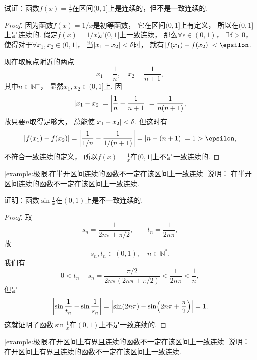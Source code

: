 \begin{example}\label{example:极限.在半开区间连续的函数不一定在该区间上一致连续}
试证：函数\(f(x) = \frac{1}{x}\)在区间\((0,1]\)上是连续的，但不是一致连续的.
\begin{proof}
因为函数\(f(x) = 1/x\)是初等函数，
它在区间\((0,1]\)上有定义，
所以在\((0,1]\)上是连续的.
假定\(f(x) = 1/x\)是\((0,1]\)上一致连续，
那么\(\forall \epsilon \in (0,1)\)，
\(\exists \delta > 0\)，
使得对于\(\forall x_1,x_2 \in (0,1]\)，
当\(\abs{x_1 - x_2} < \delta\)时，
就有\(\abs{f(x_1) - f(x_2)} < \epsilon\).

现在取原点附近的两点\begin{equation*}
	x_1 = \frac{1}{n}, \quad
	x_2 = \frac{1}{n+1},
\end{equation*}
其中\(n\in\mathbb{N}^+\)，
显然\(x_1,x_2 \in (0,1]\)上.
因\begin{equation*}
	\abs{x_1 - x_2} = \abs{\frac{1}{n} - \frac{1}{n+1}}
	= \frac{1}{n(n+1)},
\end{equation*}
故只要\(n\)取得足够大，
总能使\(\abs{x_1 - x_2} < \delta\).
但这时有\begin{equation*}
	\abs{f(x_1) - f(x_2)}
	= \abs{\frac{1}{1/n} - \frac{1}{1/(n+1)}}
	= \abs{n - (n+1)}
	= 1 > \epsilon,
\end{equation*}
不符合一致连续的定义，
所以\(f(x) = \frac{1}{x}\)在\((0,1]\)上不是一致连续的.
\end{proof}
\end{example}
\begin{remark}
\cref{example:极限.在半开区间连续的函数不一定在该区间上一致连续} 说明：
在半开区间连续的函数不一定在该区间上一致连续.
\end{remark}

\begin{example}\label{example:极限.在开区间上有界且连续的函数不一定在该区间上一致连续}
证明：函数\(\sin\frac{1}{x}\)在\((0,1)\)上是不一致连续的.
\begin{proof}
取\begin{equation*}
	s_n = \frac{1}{2n\pi+\pi/2},
	\qquad
	t_n = \frac{1}{2n\pi},
\end{equation*}
故\begin{equation*}
	s_n,t_n\in(0,1),
	\quad n\in\mathbb{N}^*.
\end{equation*}我们有\begin{equation*}
	0 < t_n - s_n = \frac{\pi/2}{2n\pi(2n\pi+\pi/2)} < \frac{1}{2n\pi} < \frac{1}{n},
\end{equation*}
但是\begin{equation*}
	\abs{\sin\frac{1}{t_n} - \sin\frac{1}{s_n}}
	= \abs{\sin(2n\pi) - \sin(2n\pi+\frac{\pi}{2})}
	= 1.
\end{equation*}
这就证明了函数\(\sin\frac{1}{x}\)在\((0,1)\)上不是一致连续的.
\end{proof}
\end{example}
\begin{remark}
\cref{example:极限.在开区间上有界且连续的函数不一定在该区间上一致连续} 说明：
在开区间上有界且连续的函数不一定在该区间上一致连续.
\end{remark}

